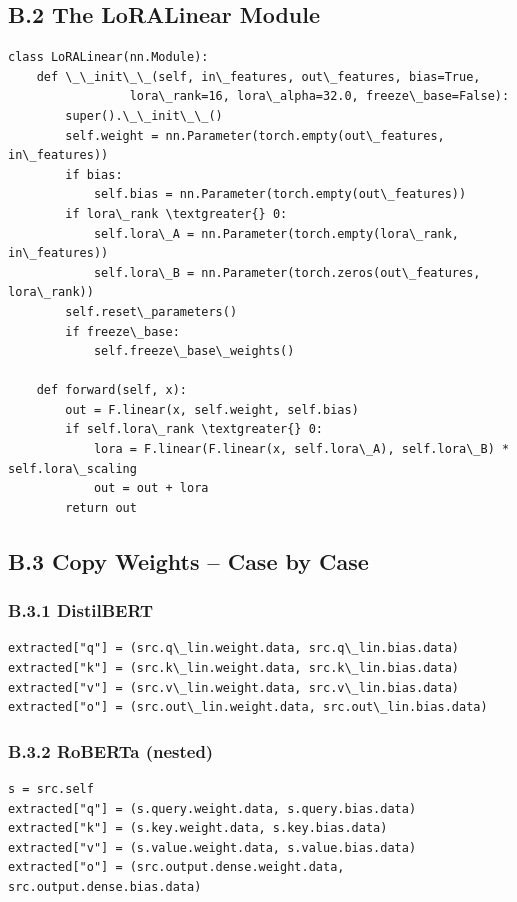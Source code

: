 \subsection{B.2 The LoRALinear Module}

\begin{lstlisting}
class LoRALinear(nn.Module):
    def \_\_init\_\_(self, in\_features, out\_features, bias=True,
                 lora\_rank=16, lora\_alpha=32.0, freeze\_base=False):
        super().\_\_init\_\_()
        self.weight = nn.Parameter(torch.empty(out\_features, in\_features))
        if bias:
            self.bias = nn.Parameter(torch.empty(out\_features))
        if lora\_rank \textgreater{} 0:
            self.lora\_A = nn.Parameter(torch.empty(lora\_rank, in\_features))
            self.lora\_B = nn.Parameter(torch.zeros(out\_features, lora\_rank))
        self.reset\_parameters()
        if freeze\_base:
            self.freeze\_base\_weights()
    
    def forward(self, x):
        out = F.linear(x, self.weight, self.bias)
        if self.lora\_rank \textgreater{} 0:
            lora = F.linear(F.linear(x, self.lora\_A), self.lora\_B) * self.lora\_scaling
            out = out + lora
        return out
\end{lstlisting}

\subsection{B.3 Copy Weights -- Case by Case}

\subsubsection{B.3.1 DistilBERT}

\begin{lstlisting}
extracted["q"] = (src.q\_lin.weight.data, src.q\_lin.bias.data)
extracted["k"] = (src.k\_lin.weight.data, src.k\_lin.bias.data)
extracted["v"] = (src.v\_lin.weight.data, src.v\_lin.bias.data)
extracted["o"] = (src.out\_lin.weight.data, src.out\_lin.bias.data)
\end{lstlisting}

\subsubsection{B.3.2 RoBERTa (nested)}

\begin{lstlisting}
s = src.self
extracted["q"] = (s.query.weight.data, s.query.bias.data)
extracted["k"] = (s.key.weight.data, s.key.bias.data)
extracted["v"] = (s.value.weight.data, s.value.bias.data)
extracted["o"] = (src.output.dense.weight.data, src.output.dense.bias.data)
\end{lstlisting}

